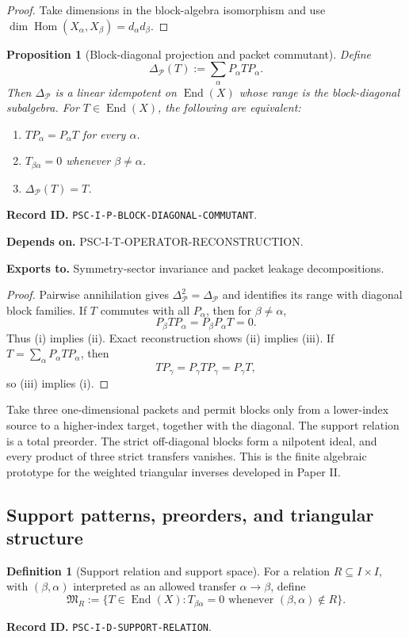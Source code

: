 \documentclass[11pt]{article}
\newtheorem{proposition}[proposition]{Proposition}
\theoremstyle{definition}
\newtheorem{definition}[definition]{Definition}
\theoremstyle{remark}
\newcommand{\Pcal}{\mathcal P}
\newcommand{\End}{\operatorname{End}}
\newcommand{\Hom}{\operatorname{Hom}}
\newcommand{\RecordID}[1]{\par\smallskip\noindent\begingroup\footnotesize\color{PSCGray}\raggedright\textbf{Record ID.} \nolinkurl{#1}.\par\endgroup}
\newcommand{\Depends}[1]{\par\noindent\begingroup\footnotesize\color{PSCGray}\raggedright\textbf{Depends on.} #1\par\endgroup}
\newcommand{\Exports}[1]{\par\noindent\begingroup\footnotesize\color{PSCGray}\raggedright\textbf{Exports to.} #1\par\endgroup}
\begin{document}
\begin{proof}
Take dimensions in the block-algebra isomorphism and use $\dim\Hom(X_\alpha,X_\beta)=d_\alpha d_\beta$.
\end{proof}

\begin{proposition}[Block-diagonal projection and packet commutant]
\label{prop:block-diagonal-projection}
Define
\[
\Delta_{\Pcal}(T):=\sum_{\alpha}P_\alpha TP_\alpha.
\]
Then $\Delta_{\Pcal}$ is a linear idempotent on $\End(X)$ whose range is the block-diagonal subalgebra.  For $T\in\End(X)$, the following are equivalent:
\begin{enumerate}[label=(\roman*)]
\item $TP_\alpha=P_\alpha T$ for every $\alpha$.
\item $T_{\beta\alpha}=0$ whenever $\beta\neq\alpha$.
\item $\Delta_{\Pcal}(T)=T$.
\end{enumerate}
\end{proposition}
\RecordID{PSC-I-P-BLOCK-DIAGONAL-COMMUTANT}
\Depends{PSC-I-T-OPERATOR-RECONSTRUCTION.}
\Exports{Symmetry-sector invariance and packet leakage decompositions.}

\begin{proof}
Pairwise annihilation gives $\Delta_{\Pcal}^2=\Delta_{\Pcal}$ and identifies its range with diagonal block families.  If $T$ commutes with all $P_\alpha$, then for $\beta\neq\alpha$,
\[
P_\beta TP_\alpha=P_\beta P_\alpha T=0.
\]
Thus (i) implies (ii).  Exact reconstruction shows (ii) implies (iii).  If $T=\sum_\alpha P_\alpha TP_\alpha$, then
\[
TP_\gamma=P_\gamma TP_\gamma=P_\gamma T,
\]
so (iii) implies (i).
\end{proof}

\begin{microexample}[title={Upper-triangular support}]
Take three one-dimensional packets and permit blocks only from a lower-index source to a higher-index target, together with the diagonal.  The support relation is a total preorder.  The strict off-diagonal blocks form a nilpotent ideal, and every product of three strict transfers vanishes.  This is the finite algebraic prototype for the weighted triangular inverses developed in Paper II.
\end{microexample}


\subsection{Support patterns, preorders, and triangular structure}
\begin{definition}[Support relation and support space]
\label{def:support-relation}
For a relation $R\subseteq I\times I$, with $(\beta,\alpha)$ interpreted as an allowed transfer $\alpha\to\beta$, define
\[
\mathfrak M_R
:=
\{T\in\End(X):T_{\beta\alpha}=0\text{ whenever }(\beta,\alpha)\notin R\}.
\]
\end{definition}
\RecordID{PSC-I-D-SUPPORT-RELATION}
\end{document}
